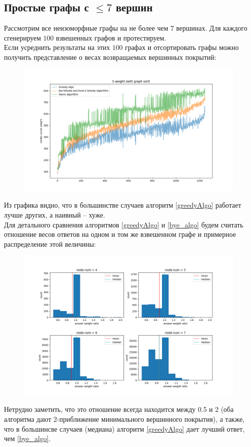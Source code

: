 \documentclass{article}
\theoremstyle{definition}
\begin{document}
  \subsection{Простые графы с $\le 7$ вершин}
  Рассмотрим все неизоморфные графы на не более чем $7$ вершинах. 
  Для каждого сгенерируем $100$ взвешенных графов и протестируем.\\
  Если усреднить результаты на этих $100$ графах и отсортировать графы можно 
  получить представление о весах возвращаемых вершинных покрытий:
  \begin{figure}[H]
  \includegraphics[scale=0.5]{img/simple_plot}
  \end{figure}
  Из графика видно, что в большинстве случаев алгоритм \ref{greedyAlgo} работает лучше других, 
  а наивный -- хуже. \\
  Для детального сравнения алгоритмов \ref{greedyAlgo} и \ref{bye_algo} будем считать отношение весов 
  ответов на одном и том же взвешенном графе и примерное распределение этой величины:
  \begin{figure}[H]
    \includegraphics[scale=0.5]{img/simple_hists}
  \end{figure}
  Нетрудно заметить, что это отношение всегда находится между 0.5 и 2 
  (оба алгоритма дают 2-приближение минимального вершинного покрытия),
  а также, что в большинсве случаев (медиана) алгоритм \ref{greedyAlgo} дает лучший ответ, 
  чем \ref{bye_algo}.
\end{document}
